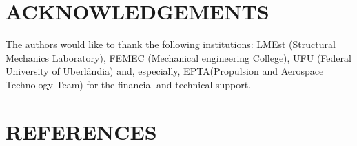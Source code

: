 \documentclass[10pt,fleqn,a4paper,twoside]{article}
\begin{document}
\section{ACKNOWLEDGEMENTS}
The authors would like to thank the following institutions: LMEst (Structural Mechanics Laboratory), FEMEC (Mechanical engineering College), UFU (Federal University of Uberl\^andia) and, especially, EPTA(Propulsion and Aerospace Technology Team) for the financial and technical support.

\section{REFERENCES} 


\renewcommand{\refname}{}

\end{document}
